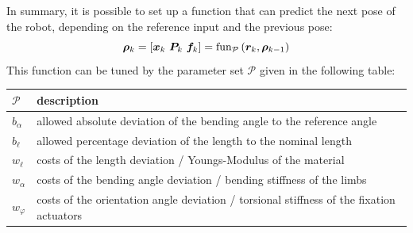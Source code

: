 \documentclass[letterpaper,10pt,conference]{ieeeconf}  %
\begin{document}
In summary, it is possible to set up a function that can predict the next pose of the robot, depending on the reference input and the previous pose:
\begin{equation}
\bm{\rho}_k = [\bm{x}_k~\bm{P}_k~\bm{f}_k] = \textnormal{fun}_{\mathcal{P}}\left( \bm{r}_k, \bm{\rho}_{k-1} \right)
\end{equation}
This function can be tuned by the parameter set $\mathcal{P}$ given in the following table:
\begin{center}
\begin{tabular}{l|p{7cm}}
$\mathcal{P}$ & description \\
\hline
$b_\alpha$ & allowed absolute deviation of the bending angle to the reference angle \\
$b_\ell$ & allowed percentage deviation of the length to the nominal length \\
$w_\ell$ & costs of the length deviation / Youngs-Modulus of the material \\
$w_\alpha$ & costs of the bending angle deviation / bending stiffness of the limbs\\
$w_\varphi$ & costs of the orientation angle deviation / torsional stiffness of the fixation actuators\\
\end{tabular}
\end{center}
\end{document}
